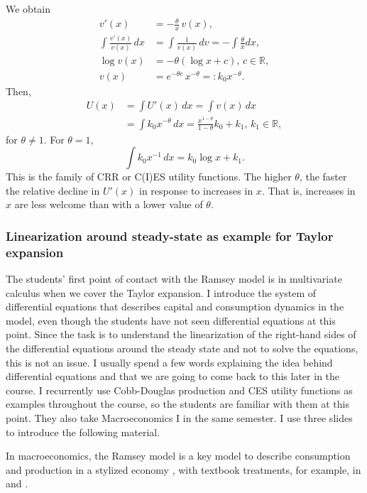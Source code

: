 \documentclass[10pt]{article}
\newcommand{\R}{\mathds{R}}
\begin{document}
We obtain
    \begin{align*}
        v'(x) &= -\frac{\theta}{x}\, v(x),\\
        \int \frac{v'(x)}{v(x)}\, dx &= \int \frac{1}{v(x)}\, dv = -\int \frac{\theta}{x} dx,\\
        \log v(x) &= - \theta(\log x + c),\, c\in\R,\\
        v(x) &= e^{-\theta c}\, x^{-\theta} =: k_0 x^{-\theta}.
    \end{align*}
    Then,
    \begin{align*}
        U(x) &= \int U'(x) \, dx = \int v(x)\, dx\\
         &= \int k_0 x^{-\theta}\, dx = \frac{x^{1-\theta}}{1-\theta}k_0  + k_1,\, k_1\in\R,
    \end{align*}
    for $\theta\neq 1$.  For $\theta =1$,
    \[
        \int k_0 x^{-1}\, dx = k_0 \log x + k_1.
    \]
    This is the family of CRR or C(I)ES utility functions.  The higher $\theta$, the faster the relative decline in $U'(x)$ in response to increases in $x$.  That is, increases in $x$ are less welcome than with a lower value of $\theta$.




\subsubsection{Linearization around steady-state as example for Taylor expansion}

The students' first point of contact with the Ramsey model is in multivariate calculus when we cover the Taylor expansion. I introduce the system of differential equations that describes capital and consumption dynamics in the model, even though the students have not seen differential equations at this point. Since the task is to understand the linearization of the right-hand sides of the differential equations around the steady state and not to solve the equations, this is not an issue. I usually spend a few words explaining the idea behind differential equations and that we are going to come back to this later in the course. I recurrently use Cobb-Douglas production and CES utility functions as examples throughout the course, so the students are familiar with them at this point. They also take Macroeconomics I in the same semester. I use three slides to introduce the following material.

In macroeconomics, the Ramsey model is a key model to describe consumption and production in a stylized economy \citep{Ramsey1928,Koopmans1963,Cass1965}, with textbook treatments, for example, in \cite{Barro2004} and \cite{Romer2006}.
\end{document}
